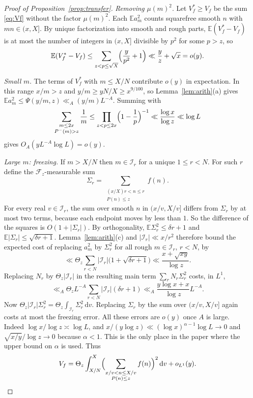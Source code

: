 \documentclass[11pt]{amsart}
\theoremstyle{remark}
\numberwithin{equation}{section}
\newcommand{\E}{\mathbb{E}}
\newcommand{\dd}{\,\mathrm{d}}
\begin{document}
\begin{proof}[Proof of Proposition~\ref{prop:transfer}]
\emph{Removing $\mu(m)^2$.} Let $V_f^*\ge V_f$ be the sum \eqref{eq:Vf} without the factor $\mu(m)^2$. Each $\E a_m^2$ counts squarefree smooth $n$ with $mn\in(x,X]$. By unique factorization into smooth and rough parts, $\E(V_f^*-V_f)$ is at most the number of integers in $(x,X]$ divisible by $p^2$ for some $p>z$, so
\[
\E(V_f^*-V_f)\le\sum_{z<p\le\sqrt X}\Bigl(\frac{y}{p^2}+1\Bigr)\ll\frac yz+\sqrt x=o(y).
\]

\emph{Small $m$.} The terms of $V_f^*$ with $m\le X/N$ contribute $o(y)$ in expectation. In this range $x/m>z$ and $y/m\ge yN/X\ge x^{9/100}$, so Lemma~\ref{lem:arith}(a) gives $\E a_m^2\le\Psi(y/m,z)\ll_A(y/m)L^{-A}$. Summing with
\[
\sum_{\substack{m\le2x\\ P^-(m)>z}}\frac1m\le\prod_{z<p\le2x}\Bigl(1-\frac1p\Bigr)^{-1}\ll\frac{\log x}{\log z}\ll\log L
\]
gives $O_A(yL^{-A}\log L)=o(y)$.

\emph{Large $m$: freezing.} If $m>X/N$ then $m\in\mathcal I_r$ for a unique $1\le r<N$. For such $r$ define the $\mathcal F_z$-measurable sum
\[
\Sigma_r=\sum_{\substack{(x/X)r<n\le r\\ P(n)\le z}}f(n).
\]
For every real $v\in\mathcal I_r$, the sum over smooth $n$ in $(x/v,X/v]$ differs from $\Sigma_r$ by at most two terms, because each endpoint moves by less than $1$. So the difference of the squares is $O(1+|\Sigma_r|)$. By orthogonality, $\E\Sigma_r^2\le\delta r+1$ and $\E|\Sigma_r|\le\sqrt{\delta r+1}$. Lemma~\ref{lem:arith}(c) and $|\mathcal I_r|\ll x/r^2$ therefore bound the expected cost of replacing $a_m^2$ by $\Sigma_r^2$ for all rough $m\in\mathcal I_r$, $r<N$, by
\[
\ll\Theta_z\sum_{r<N}|\mathcal I_r|\bigl(1+\sqrt{\delta r+1}\bigr)\ll\frac{x+\sqrt{xy}}{\log z}.
\]
Replacing $N_r$ by $\Theta_z|\mathcal I_r|$ in the resulting main term $\sum_rN_r\Sigma_r^2$ costs, in $L^1$,
\[
\ll_A\Theta_zL^{-A}\sum_{r<N}|\mathcal I_r|(\delta r+1)\ll_A\frac{y\log x+x}{\log z}L^{-A}.
\]
Now $\Theta_z|\mathcal I_r|\Sigma_r^2=\Theta_z\int_{\mathcal I_r}\Sigma_r^2\dd v$. Replacing $\Sigma_r$ by the sum over $(x/v,X/v]$ again costs at most the freezing error. All these errors are $o(y)$ once $A$ is large. Indeed $\log x/\log z\asymp\log L$, and $x/(y\log z)\ll(\log x)^{\alpha-1}\log L\to0$ and $\sqrt{x/y}/\log z\to0$ because $\alpha<1$. This is the only place in the paper where the upper bound on $\alpha$ is used. Thus
\[
V_f=\Theta_z\int_{X/N}^{X}\Bigl(\sum_{\substack{x/v<n\le X/v\\ P(n)\le z}}f(n)\Bigr)^2\dd v+o_{L^1}(y).
\]


\end{proof}
\end{document}
